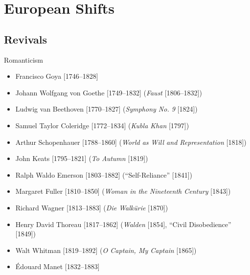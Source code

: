 \section{European Shifts}

\subsection{Revivals}
\begin{frame}{Romanticism}
	\begin{itemize}
		\item<1,3-13>Francisco Goya [1746--1828]
		\item<3-13>Johann Wolfgang von Goethe [1749--1832] (\emph{Faust} [1806--1832])
		\item<4-13>Ludwig van Beethoven [1770--1827] (\emph{Symphony No. 9} [1824])
		\item<5-13>Samuel Taylor Coleridge [1772--1834] (\emph{Kubla Khan} [1797])
		\item<6-13>Arthur Schopenhauer [1788--1860] (\emph{World as Will and Representation} [1818])
		\item<7-13>John Keats [1795--1821] (\emph{To Autumn} [1819])
		\item<8-13>Ralph Waldo Emerson [1803--1882] (``Self-Reliance'' [1841])
		\item<9-13>Margaret Fuller [1810--1850] (\emph{Woman in the Nineteenth Century} [1843])
		\item<10-13>Richard Wagner [1813--1883] (\emph{Die Walk{\"u}rie} [1870])
		\item<11-13>Henry David Thoreau [1817--1862] (\emph{Walden} [1854], ``Civil Disobedience'' [1849])
		\item<12-13>Walt Whitman [1819--1892] (\emph{O Captain, My Captain} [1865])
		\item<13>{\'E}douard Manet [1832--1883]
	\end{itemize}
\end{frame}

